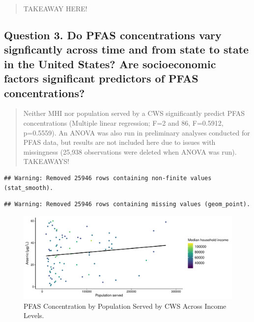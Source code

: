 \documentclass[12pt,]{article}
\begin{document}
\begin{quote}
TAKEAWAY HERE!
\end{quote}

\hypertarget{question-3.-do-pfas-concentrations-vary-signficantly-across-time-and-from-state-to-state-in-the-united-states-are-socioeconomic-factors-significant-predictors-of-pfas-concentrations}{%
\subsection{Question 3. Do PFAS concentrations vary signficantly across
time and from state to state in the United States? Are socioeconomic
factors significant predictors of PFAS
concentrations?}\label{question-3.-do-pfas-concentrations-vary-signficantly-across-time-and-from-state-to-state-in-the-united-states-are-socioeconomic-factors-significant-predictors-of-pfas-concentrations}}

\begin{quote}
Neither MHI nor population served by a CWS significantly predict PFAS
concentrations (Multiple linear regression; F=2 and 86, F=0.5912,
p=0.5559). An ANOVA was also run in preliminary analyses conducted for
PFAS data, but results are not included here due to issues with
missingness (25,938 observations were deleted when ANOVA was run).
TAKEAWAYS!
\end{quote}

\begin{verbatim}
## Warning: Removed 25946 rows containing non-finite values (stat_smooth).
\end{verbatim}

\begin{verbatim}
## Warning: Removed 25946 rows containing missing values (geom_point).
\end{verbatim}

\begin{figure}
\centering
\includegraphics{Project_Template_files/figure-latex/figs12-1.pdf}
\caption{PFAS Concentration by Population Served by CWS Across Income
Levels.}
\end{figure}
\end{document}
